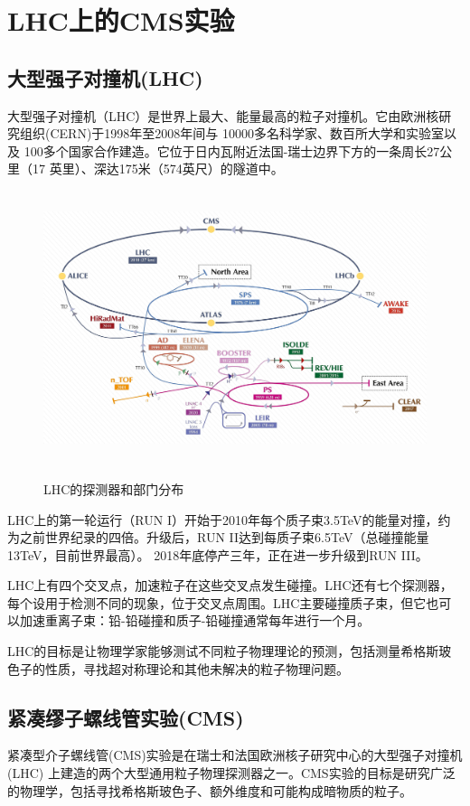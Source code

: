 \section{LHC上的CMS实验}
\subsection{大型强子对撞机(LHC)}
大型强子对撞机（LHC）是世界上最大、能量最高的粒子对撞机。它由欧洲核研究组织(CERN)于1998年至2008年间与 10000多名科学家、数百所大学和实验室以及 100多个国家合作建造。它位于日内瓦附近法国-瑞士边界下方的一条周长27公里（17 英里）、深达175米（574英尺）的隧道中。

\begin{figure}[H]
 \centering
 \caption{LHC的探测器和部门分布}
 \includegraphics[height=8cm, width=14cm]{pictures/CERN_accelerator_complex_(cropped_2).jpeg}
 \label{fig:1.4}
\end{figure}

LHC上的第一轮运行（RUN I）开始于2010年每个质子束3.5TeV的能量对撞，约为之前世界纪录的四倍。升级后，RUN II达到每质子束6.5TeV（总碰撞能量13TeV，目前世界最高）。 2018年底停产三年，正在进一步升级到RUN III。

LHC上有四个交叉点，加速粒子在这些交叉点发生碰撞。LHC还有七个探测器，每个设用于检测不同的现象，位于交叉点周围。LHC主要碰撞质子束，但它也可以加速重离子束：铅-铅碰撞和质子-铅碰撞通常每年进行一个月。

LHC的目标是让物理学家能够测试不同粒子物理理论的预测，包括测量希格斯玻色子的性质，寻找超对称理论和其他未解决的粒子物理问题。

\subsection{紧凑缪子螺线管实验(CMS)}
紧凑型介子螺线管(CMS)实验是在瑞士和法国欧洲核子研究中心的大型强子对撞机(LHC) 上建造的两个大型通用粒子物理探测器之一。CMS实验的目标是研究广泛的物理学，包括寻找希格斯玻色子、额外维度和可能构成暗物质的粒子。

